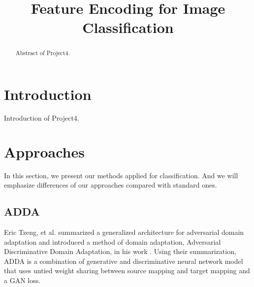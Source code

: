 \documentclass[conference]{IEEEtran}
\begin{document}
\title{Feature Encoding for Image Classification\\
}

\author{
\and
{}
\and
{}
}

\maketitle

\begin{abstract}
Abstract of Project4.
\end{abstract}



\section{Introduction}
Introduction of Project4.


\section{Approaches}
In this section, we present our methods applied for classification. And we will emphasize differences of our approaches compared with standard ones.

\subsection{ADDA}
Eric Tzeng, et al. summarized a generalized architecture for adversarial domain adaptation and introduced a method of domain adaptation, Adversarial Discriminative Domain Adaptation, in his work \cite{ADDA1}. Using their summarization, ADDA is a combination of generative and discriminative neural network model that uses untied weight sharing between source mapping and target mapping and a GAN loss.
\end{document}
